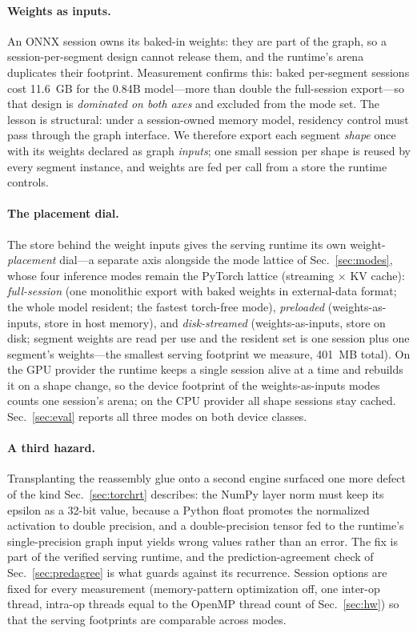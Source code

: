 \documentclass[journal]{IEEEtran}
\begin{document}
\paragraph{Weights as inputs.}
An ONNX session owns its baked-in weights: they are part of the graph, so a
session-per-segment design cannot release them, and the runtime's arena
duplicates their footprint. Measurement confirms this: baked per-segment
sessions cost 11.6~GB for the 0.84B model---more than double the full-session
export---so that design is \emph{dominated on both axes} and excluded from
the mode set. The lesson is structural: under a session-owned memory model,
residency control must pass through the graph interface. We therefore export
each segment \emph{shape} once with its weights declared as graph
\emph{inputs}; one small session per shape is reused by every segment
instance, and weights are fed per call from a store the runtime controls.

\paragraph{The placement dial.}
The store behind the weight inputs gives the serving runtime its own
weight-\emph{placement} dial---a separate axis alongside the mode lattice of
Sec.~\ref{sec:modes}, whose four inference modes remain the PyTorch lattice
(streaming $\times$ KV cache):
\emph{full-session} (one monolithic export with baked weights in
external-data format; the whole model resident; the fastest torch-free
mode), \emph{preloaded} (weights-as-inputs, store in host memory), and
\emph{disk-streamed} (weights-as-inputs, store on disk; segment weights are
read per use and the resident set is one session plus one segment's
weights---the smallest serving footprint we measure, 401~MB total). On the
GPU provider the runtime keeps a single session alive at a time and
rebuilds it on a shape change, so the device footprint of the
weights-as-inputs modes counts one session's arena; on the CPU provider all
shape sessions stay cached. Sec.~\ref{sec:eval} reports all three modes on
both device classes.

\paragraph{A third hazard.}
Transplanting the reassembly glue onto a second engine surfaced one more
defect of the kind Sec.~\ref{sec:torchrt} describes: the NumPy layer norm
must keep its epsilon as a 32-bit value, because a Python float promotes
the normalized activation to double precision, and a double-precision
tensor fed to the runtime's single-precision graph input yields wrong
values rather than an error. The fix is part of the verified serving
runtime, and the prediction-agreement check of Sec.~\ref{sec:predagree} is
what guards against its recurrence. Session options are fixed for every
measurement (memory-pattern optimization off, one inter-op thread, intra-op
threads equal to the OpenMP thread count of Sec.~\ref{sec:hw}) so that the
serving footprints are comparable across modes.
\end{document}
